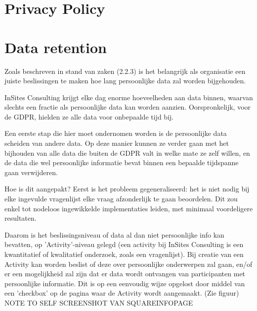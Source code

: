
\section{Privacy Policy}

\section{Data retention}

Zoals beschreven in stand van zaken (2.2.3) is het belangrijk als organisatie een juiste beslissingen te maken hoe lang persoonlijke data zal worden bijgehouden. 

InSites Consulting krijgt elke dag enorme hoeveelheden aan data binnen, waarvan slechts een fractie als persoonlijke data kan worden aanzien. Oorspronkelijk, voor de GDPR, hielden ze alle data voor onbepaalde tijd bij. 

Een eerste stap die hier moet ondernomen worden is de persoonlijke data scheiden van andere data. Op deze manier kunnen ze verder gaan met het bijhouden van alle data die buiten de GDPR valt in welke mate ze zelf willen, en de data die wel persoonlijke informatie bevat binnen een bepaalde tijdspanne gaan verwijderen. 

Hoe is dit aangepakt? Eerst is het probleem gegeneraliseerd: het is niet nodig bij elke ingevulde vragenlijst elke vraag afzonderlijk te gaan beoordelen. 
Dit zou enkel tot nodeloos ingewikkelde implementaties leiden, met minimaal voordeligere resultaten. 

Daarom is het beslissingsniveau of data al dan niet persoonlijke info kan bevatten, op 'Activity'-niveau gelegd (een activity bij InSites Consulting is een kwantitatief of kwalitatief onderzoek, zoals een vragenlijst). Bij creatie van een Activity kan worden beslist of deze over persoonlijke onderwerpen zal gaan, en/of er een mogelijkheid zal zijn dat er data wordt ontvangen van participanten met persoonlijke informatie. 
Dit is op een eenvoudig wijze opgelost door middel van een 'checkbox' op de pagina waar de Activity wordt aangemaakt. (Zie figuur) NOTE TO SELF SCREENSHOT VAN SQUAREINFOPAGE 

